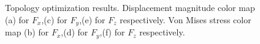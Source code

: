 \begin{figure}[hbt!]
{                                                     }
                                                   
     \caption{Topology optimization results.  Displacement magnitude color map (a) for $F_x$,(c) for $F_y$,(e) for $F_z$ respectively.
     Von Mises stress color map (b) for $F_x$,(d) for $F_y$,(f) for $F_z$ respectively. \label{fig.2.28}} 
 \end{figure}
 \clearpage
